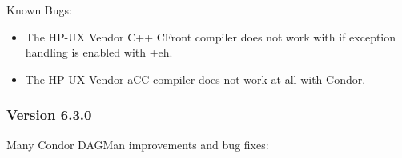 \noindent Known Bugs:
\begin{itemize}
\item The HP-UX Vendor C++ CFront compiler does not work with 
if exception handling is enabled with +eh.

\item The HP-UX Vendor aCC compiler does not work at all with Condor.
\end{itemize}

\subsubsection{\label{sec:New-6-3-0}Version 6.3.0}

\noindent
Many Condor DAGMan improvements and bug fixes:

